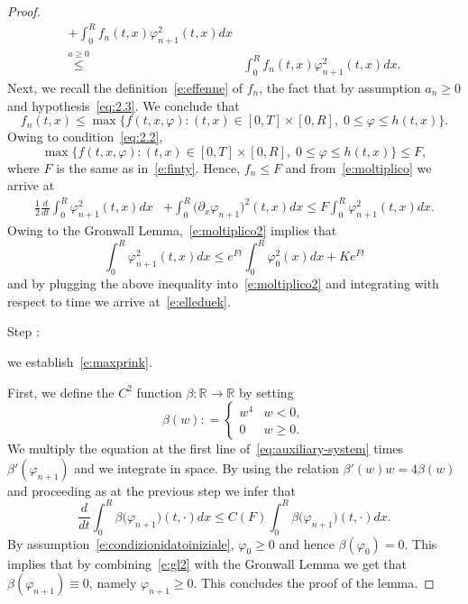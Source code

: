 \documentclass[11pt,leqno]{amsart}
\newcounter{stepnb}
\numberwithin{equation}{section}
\begin{document}
\begin{proof}
\begin{equation}
\begin{split}
     
     + 
    \int_0^R f_n (t, x) \varphi_{n+1}^2   (t, x) dx \\
     \stackrel{a \ge 0}{\leq}&
     \int_0^R f_n (t, x) \varphi_{n+1}^2   (t, x) dx.
\end{split}
\end{equation}
Next, we recall the definition~\eqref{e:effenne}  of $f_n$, the fact that by assumption $a_n \ge 0$ and hypothesis~\eqref{eq:2.3}. We conclude that 
$$
    f_n (t, x) \leq \max \Big\{ f(t, x, {\varphi}): 
    (t, x) \in [0, T] \times [0, R], \; 0 \leq {\varphi} \leq h(t, x) \Big\}. 
$$
Owing to condition~\eqref{eq:2.2}, 
$$
    \max \Big\{ f(t, x, {\varphi}): 
    (t, x) \in [0, T] \times [0, R], \; 0 \leq {\varphi} \leq h(t, x) \Big\} \leq F,
$$
where $F$ is the same as in~\eqref{e:finty}. Hence, $f_n \leq F$ and from~\eqref{e:moltiplico} we arrive at 
\begin{equation}
\label{e:moltiplico2}
\begin{split}
    \frac{1}{2} \frac{d}{dt} \int_0^R \varphi_{n+1}^2 (t, x) dx & +
    \int_0^R \big( \partial_x \varphi_{n+1} \big)^2 (t, x) dx \leq 
    F \int_0^R \varphi_{n+1}^2   (t, x) dx. 
\end{split}
\end{equation}
Owing to the Gronwall Lemma,~\eqref{e:moltiplico2} implies that 
$$
   \int_0^R \varphi_{n+1}^2 (t, x) dx \leq 
    e^{Ft}\int_0^R \varphi_0^2 (x) dx + K e^{Ft}
$$
and by plugging the above inequality into~\eqref{e:moltiplico2} and integrating with respect to time we arrive at~\eqref{e:elleduek}. \\
{{{\sc \addtocounter{stepnb}{1}\noindent  Step :} {we establish~\eqref{e:maxprink}}.}} First, we define the $C^2$ function $\beta: {\mathbb{R}} \to {\mathbb{R}}$ by setting
\begin{equation}
\label{e:beta}
    \beta (w) : =
    \left\{
    \begin{array}{ll}
    w^4 & w <0, \\
    0 & w \ge 0.
    \end{array}
    \right.
\end{equation}
We multiply the equation at the first line
of~\eqref{eq:auxiliary-system} times $\beta'(\varphi_{n+1})$
and we integrate in space. By using the relation $\beta'(w) w= 4 \beta(w)$ and proceeding as at the previous step we infer that
\begin{equation}
\label{e:gl2}
    \frac{d}{dt} \int_0^R \beta \big(\varphi_{n+1} \big)(t, \cdot) dx
    \leq C(F) \int_0^R \beta \big(\varphi_{n+1} \big)(t, \cdot) dx.  
\end{equation}
By assumption~\eqref{e:condizionidatoiniziale}, $\varphi_0 \ge 0$ and hence $\beta (\varphi_0) =0$. This implies 
that by combining~\eqref{e:gl2} with the Gronwall Lemma we get that $ \beta (\varphi_{n+1}) \equiv 0$, namely $\varphi_{n+1} \ge 0$. This concludes the proof of the lemma. 
\end{proof}
\end{document}
